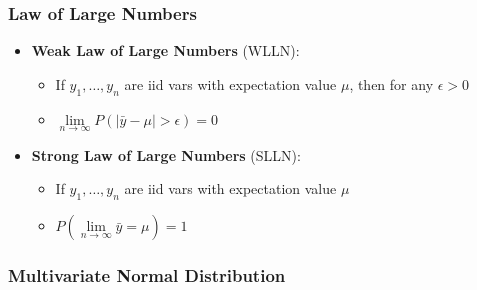 \documentclass{article}
\begin{document}
\subsubsection{Law of Large Numbers}

\begin{itemize}
    \item \textbf{Weak Law of Large Numbers} (WLLN):
    \begin{itemize}
        \item If $y_1,\dots,y_n$ are iid vars with expectation value $\mu$, then for any $\epsilon > 0$
        \item $\lim\limits_{n \to \infty} P(|\bar{y}-\mu| > \epsilon)=0$
    \end{itemize}
    \item \textbf{Strong Law of Large Numbers} (SLLN):
    \begin{itemize}
        \item If $y_1,\dots,y_n$ are iid vars with expectation value $\mu$
        \item $P(\lim\limits_{n \to \infty} \bar{y}=\mu)=1$
    \end{itemize}
\end{itemize}

\subsubsection{Multivariate Normal Distribution}
\end{document}
